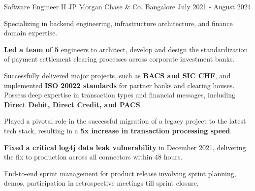 
\begin{cventries}

  \cventry
    {Software Engineer II} %
    {JP Morgan Chase \& Co.} %
    {Bangalore} %
    {July 2021 - August 2024} %
    {
      \begin{cvitems} %
        \item {Specializing in backend engineering, infrastructure architecture, and finance domain expertise.}
        \item {\textbf{Led a team of 5} engineers to architect, develop and design the standardization of payment settlement clearing processes across corporate investment banks.}
        \item {Successfully delivered major projects, such as \textbf{BACS and SIC CHF}, and implemented \textbf{ISO 20022 standards} for partner banks and clearing houses. Possess deep expertise in transaction types and financial messages, including \textbf{Direct Debit, Direct Credit, and PACS}.}
        \item {Played a pivotal role in the successful migration of a legacy project to the latest tech stack, resulting in a \textbf{5x increase in transaction processing speed}.}
        \item {\textbf{Fixed a critical log4j data leak vulnerability} in December 2021, delivering the fix to production across all connectors within 48 hours.}
        \item {End-to-end sprint management for product release involving sprint planning, demos, participation in retrospective meetings till sprint closure.}
      \end{cvitems}
    }


\end{cventries}
